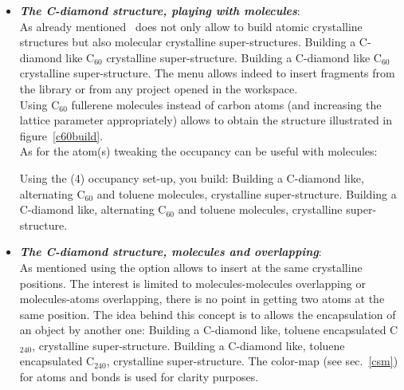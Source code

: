 \begin{enumerate}
\begin{itemize}
\newpage
\item {\bf{\textit{The C-diamond structure, playing with molecules}}}: \\
As already mentioned \atomes\ does not only allow to build atomic crystalline structures but also molecular crystalline super-structures. 
{Building a C-diamond like C$_{60}$ crystalline super-structure.}
{Building a C-diamond like C$_{60}$ crystalline super-structure.}
\clearpage
\noindent 
The  menu allows indeed to insert fragments from the library or from any project opened in the workspace. \\
Using C$_{60}$ fullerene molecules instead of carbon atoms (and increasing the lattice parameter appropriately) allows to obtain the structure illustrated in figure~\ref{c60build}. \\
As for the atom(s) tweaking the occupancy can be useful with molecules:
\begin{center}\end{center}
Using the (4)  occupancy set-up, you build:
{Building a C-diamond like, alternating C$_{60}$ and toluene molecules, crystalline super-structure.}
{Building a C-diamond like, alternating C$_{60}$ and toluene molecules, crystalline super-structure.}
\item {\bf{\textit{The C-diamond structure, molecules and overlapping}}}:\\
As mentioned using the  option allows to insert at the same crystalline positions. 
The interest is limited to molecules-molecules overlapping or molecules-atoms overlapping, there is no
point in getting two atoms at the same position. 
The idea behind this concept is to allows the encapsulation of an object by another one:
{Building a C-diamond like, toluene encapsulated  C$_{240}$, crystalline super-structure.}
{Building a C-diamond like, toluene encapsulated  C$_{240}$, crystalline super-structure. 
The  color-map (see sec.~\ref{csm}) for atoms and bonds is used for clarity purposes.}
\end{itemize}
\end{enumerate}
\clearpage
{}
